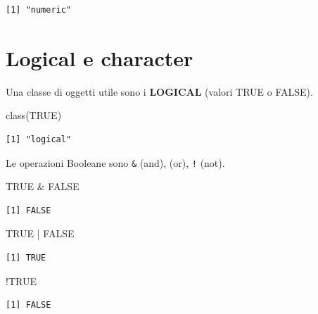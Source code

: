 \documentclass[
  italian,
  letterpaper,
]{book}
\newenvironment{Shaded}{\begin{snugshade}}{\end{snugshade}}
\newcommand{\ConstantTok}[1]{\textcolor[rgb]{0.56,0.35,0.01}{#1}}
\newcommand{\FunctionTok}[1]{\textcolor[rgb]{0.28,0.35,0.67}{#1}}
\newcommand{\NormalTok}[1]{\textcolor[rgb]{0.00,0.23,0.31}{#1}}
\newcommand{\SpecialCharTok}[1]{\textcolor[rgb]{0.37,0.37,0.37}{#1}}
\theoremstyle{definition}
\theoremstyle{remark}
\begin{document}
\begin{verbatim}
[1] "numeric"
\end{verbatim}

\section{Logical e character}\label{logical-e-character}

Una classe di oggetti utile sono i \textbf{LOGICAL} (valori TRUE o
FALSE).

\begin{Shaded}
\begin{Highlighting}[]
\FunctionTok{class}\NormalTok{(}\ConstantTok{TRUE}\NormalTok{)}
\end{Highlighting}
\end{Shaded}

\begin{verbatim}
[1] "logical"
\end{verbatim}

Le operazioni Booleane sono \texttt{\&} (and), \texttt{\textbar{}} (or),
\texttt{!} (not).

\begin{Shaded}
\begin{Highlighting}[]
\ConstantTok{TRUE} \SpecialCharTok{\&} \ConstantTok{FALSE}
\end{Highlighting}
\end{Shaded}

\begin{verbatim}
[1] FALSE
\end{verbatim}

\begin{Shaded}
\begin{Highlighting}[]
\ConstantTok{TRUE} \SpecialCharTok{|} \ConstantTok{FALSE}
\end{Highlighting}
\end{Shaded}

\begin{verbatim}
[1] TRUE
\end{verbatim}

\begin{Shaded}
\begin{Highlighting}[]
\SpecialCharTok{!}\ConstantTok{TRUE}
\end{Highlighting}
\end{Shaded}

\begin{verbatim}
[1] FALSE
\end{verbatim}
\end{document}
